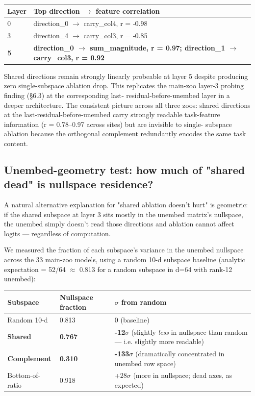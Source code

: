 \begin{center}
\begin{tabular}{|l|l|}
\hline
\textbf{Layer} & \textbf{Top direction $\to$ feature correlation} \\
\hline
0 & direction\_0 $\to$ carry\_col4, r = -0.98 \\
3 & direction\_4 $\to$ carry\_col3, r = -0.85 \\
\textbf{5} & \textbf{direction\_0 $\to$ sum\_magnitude, r = 0.97; direction\_1 $\to$ carry\_col3, r = 0.92} \\
\hline
\end{tabular}
\end{center}


Shared directions remain strongly linearly probeable at layer 5 despite
producing zero single-subspace ablation drop. This replicates the
main-zoo layer-3 probing finding (\S{}6.3) at the corresponding last-
residual-before-unembed layer in a deeper architecture. The consistent
picture across all three zoos: shared directions at the
last-residual-before-unembed carry strongly readable task-feature
information (r = 0.78--0.97 across sites) but are invisible to single-
subspace ablation because the orthogonal complement redundantly encodes
the same task content.

\subsection{Unembed-geometry test: how much of "shared dead" is nullspace residence?}

A natural alternative explanation for "shared ablation doesn't hurt" is
geometric: if the shared subspace at layer 3 sits mostly in the unembed
matrix's nullspace, the unembed simply doesn't read those directions and
ablation cannot affect logits --- regardless of computation.

We measured the fraction of each subspace's variance in the unembed
nullspace across the 33 main-zoo models, using a random 10-d subspace
baseline (analytic expectation = 52/64 $\approx$ 0.813 for a random subspace in
d=64 with rank-12 unembed):

\begin{center}
\begin{tabular}{|l|l|l|}
\hline
\textbf{Subspace} & \textbf{Nullspace fraction} & \textbf{$\sigma$ from random} \\
\hline
Random 10-d & 0.813 & 0 (baseline) \\
\textbf{Shared} & \textbf{0.767} & \textbf{-12$\sigma$} (slightly \emph{less} in nullspace than random --- i.e. slightly more readable) \\
\textbf{Complement} & \textbf{0.310} & \textbf{-133$\sigma$} (dramatically concentrated in unembed row space) \\
Bottom-of-ratio & 0.918 & +28$\sigma$ (more in nullspace; dead axes, as expected) \\
\hline
\end{tabular}
\end{center}


